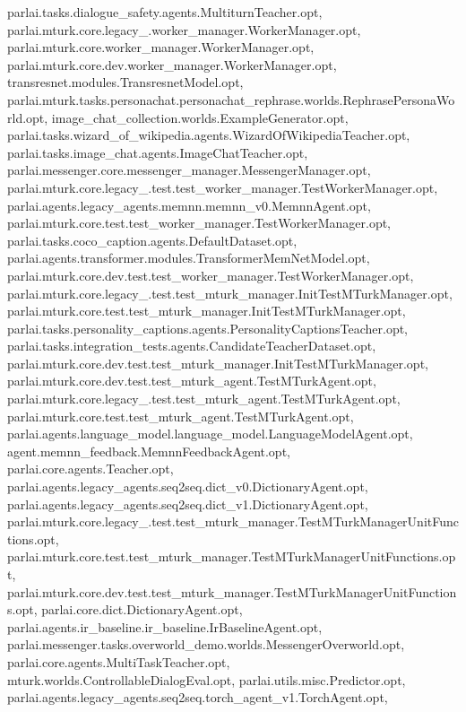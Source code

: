 parlai.\+tasks.\+dialogue\+\_\+safety.\+agents.\+Multiturn\+Teacher.\+opt, parlai.\+mturk.\+core.\+legacy\+\_.\+worker\+\_\+manager.\+Worker\+Manager.\+opt, parlai.\+mturk.\+core.\+worker\+\_\+manager.\+Worker\+Manager.\+opt, parlai.\+mturk.\+core.\+dev.\+worker\+\_\+manager.\+Worker\+Manager.\+opt, transresnet.\+modules.\+Transresnet\+Model.\+opt, parlai.\+mturk.\+tasks.\+personachat.\+personachat\+\_\+rephrase.\+worlds.\+Rephrase\+Persona\+World.\+opt, image\+\_\+chat\+\_\+collection.\+worlds.\+Example\+Generator.\+opt, parlai.\+tasks.\+wizard\+\_\+of\+\_\+wikipedia.\+agents.\+Wizard\+Of\+Wikipedia\+Teacher.\+opt, parlai.\+tasks.\+image\+\_\+chat.\+agents.\+Image\+Chat\+Teacher.\+opt, parlai.\+messenger.\+core.\+messenger\+\_\+manager.\+Messenger\+Manager.\+opt, parlai.\+mturk.\+core.\+legacy\+\_.\+test.\+test\+\_\+worker\+\_\+manager.\+Test\+Worker\+Manager.\+opt, parlai.\+agents.\+legacy\+\_\+agents.\+memnn.\+memnn\+\_\+v0.\+Memnn\+Agent.\+opt, parlai.\+mturk.\+core.\+test.\+test\+\_\+worker\+\_\+manager.\+Test\+Worker\+Manager.\+opt, parlai.\+tasks.\+coco\+\_\+caption.\+agents.\+Default\+Dataset.\+opt, parlai.\+agents.\+transformer.\+modules.\+Transformer\+Mem\+Net\+Model.\+opt, parlai.\+mturk.\+core.\+dev.\+test.\+test\+\_\+worker\+\_\+manager.\+Test\+Worker\+Manager.\+opt, parlai.\+mturk.\+core.\+legacy\+\_.\+test.\+test\+\_\+mturk\+\_\+manager.\+Init\+Test\+M\+Turk\+Manager.\+opt, parlai.\+mturk.\+core.\+test.\+test\+\_\+mturk\+\_\+manager.\+Init\+Test\+M\+Turk\+Manager.\+opt, parlai.\+tasks.\+personality\+\_\+captions.\+agents.\+Personality\+Captions\+Teacher.\+opt, parlai.\+tasks.\+integration\+\_\+tests.\+agents.\+Candidate\+Teacher\+Dataset.\+opt, parlai.\+mturk.\+core.\+dev.\+test.\+test\+\_\+mturk\+\_\+manager.\+Init\+Test\+M\+Turk\+Manager.\+opt, parlai.\+mturk.\+core.\+dev.\+test.\+test\+\_\+mturk\+\_\+agent.\+Test\+M\+Turk\+Agent.\+opt, parlai.\+mturk.\+core.\+legacy\+\_.\+test.\+test\+\_\+mturk\+\_\+agent.\+Test\+M\+Turk\+Agent.\+opt, parlai.\+mturk.\+core.\+test.\+test\+\_\+mturk\+\_\+agent.\+Test\+M\+Turk\+Agent.\+opt, parlai.\+agents.\+language\+\_\+model.\+language\+\_\+model.\+Language\+Model\+Agent.\+opt, agent.\+memnn\+\_\+feedback.\+Memnn\+Feedback\+Agent.\+opt, parlai.\+core.\+agents.\+Teacher.\+opt, parlai.\+agents.\+legacy\+\_\+agents.\+seq2seq.\+dict\+\_\+v0.\+Dictionary\+Agent.\+opt, parlai.\+agents.\+legacy\+\_\+agents.\+seq2seq.\+dict\+\_\+v1.\+Dictionary\+Agent.\+opt, parlai.\+mturk.\+core.\+legacy\+\_.\+test.\+test\+\_\+mturk\+\_\+manager.\+Test\+M\+Turk\+Manager\+Unit\+Functions.\+opt, parlai.\+mturk.\+core.\+test.\+test\+\_\+mturk\+\_\+manager.\+Test\+M\+Turk\+Manager\+Unit\+Functions.\+opt, parlai.\+mturk.\+core.\+dev.\+test.\+test\+\_\+mturk\+\_\+manager.\+Test\+M\+Turk\+Manager\+Unit\+Functions.\+opt, parlai.\+core.\+dict.\+Dictionary\+Agent.\+opt, parlai.\+agents.\+ir\+\_\+baseline.\+ir\+\_\+baseline.\+Ir\+Baseline\+Agent.\+opt, parlai.\+messenger.\+tasks.\+overworld\+\_\+demo.\+worlds.\+Messenger\+Overworld.\+opt, parlai.\+core.\+agents.\+Multi\+Task\+Teacher.\+opt, mturk.\+worlds.\+Controllable\+Dialog\+Eval.\+opt, parlai.\+utils.\+misc.\+Predictor.\+opt, parlai.\+agents.\+legacy\+\_\+agents.\+seq2seq.\+torch\+\_\+agent\+\_\+v1.\+Torch\+Agent.\+opt, 